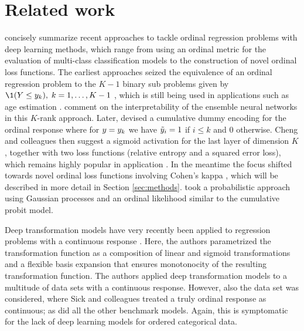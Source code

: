 \documentclass[article,nojss,shortnames]{jss}\usepackage[]{graphicx}\usepackage[]{color}
\begin{document}
\section{Related work} \label{sec:related}

\citet{vargas2020cumulative} concisely summarize recent approaches to tackle
ordinal regression problems with deep learning methods, which range from using
an ordinal metric for the evaluation of multi-class classification models to %
the construction of novel ordinal loss functions. %
The earliest approaches seized the equivalence of an ordinal regression problem
to the $K - 1$ binary sub problems given by $\1(\rY \leq \ry_k), \; k = 1, \dots, K - 1$
\citep{frank2001simple}, which is still being used in applications such as
age estimation \citep{niu2016ordinal, zhu2018facial}. \citet{amorim2018interpreting}
comment on the interpretability of the ensemble neural networks in this $K$-rank %
approach. %
Later, \citet{cheng2008neural} devised a cumulative dummy encoding for the ordinal
response where for $y = y_k$ we have $\tilde{y}_i = 1$ if $i \leq k$ and $0$
otherwise. Cheng and colleagues then suggest a sigmoid activation for the last
layer of dimension $K$, together with two loss functions (relative entropy and
a squared error loss), which remains highly popular in application
\citep{liu2017ordinal, garg2019robust, cao2019rank, zhu2020ordinal}.
In the meantime the focus shifted towards novel ordinal loss functions involving
Cohen's kappa \citep{cohen1960coefficient, cohen1968weighted, de2018weighted,
de2019deep, vargas2019deep, vargas2020cumulative}, which will be described in
more detail in Section \ref{sec:methods}. \citet{liu2019probabilistic} took
a probabilistic approach using Gaussian processes and an ordinal likelihood
similar to the cumulative probit model.

Deep transformation models have very recently been applied to
regression problems with a continuous response \citep{sick2020deep}.
Here, the authors parametrized the transformation function as a composition of
linear and sigmoid transformations and a flexible basis expansion that ensures
monotonocity of the resulting transformation function.
The authors applied deep transformation models to a multitude of data sets with
a continuous response.
However, also the  data set was considered, where Sick and colleagues
treated a truly ordinal response as continuous; as did all the other benchmark models.
Again, this is symptomatic for the lack of deep learning models for ordered categorical
data.
\end{document}
